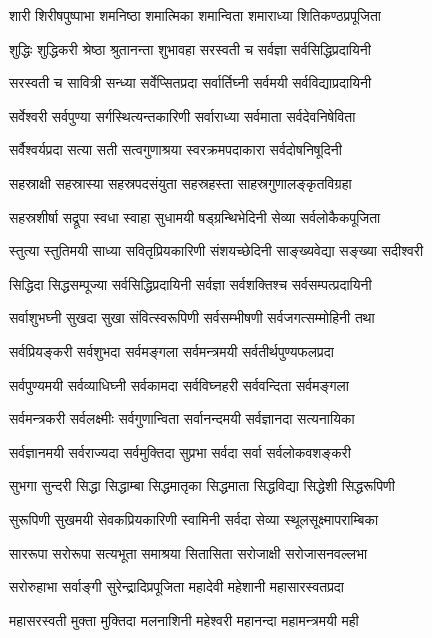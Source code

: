 \twolineshloka
{शारी शिरीषपुष्पाभा शमनिष्ठा शमात्मिका}
{शमान्विता शमाराध्या शितिकण्ठप्रपूजिता}%

\twolineshloka
{शुद्धिः शुद्धिकरी श्रेष्ठा श्रुतानन्ता शुभावहा}
{सरस्वती च सर्वज्ञा सर्वसिद्धिप्रदायिनी}%

\twolineshloka
{सरस्वती च सावित्री सन्ध्या सर्वेप्सितप्रदा}
{सर्वार्तिघ्नी सर्वमयी सर्वविद्याप्रदायिनी}%

\twolineshloka
{सर्वेश्वरी सर्वपुण्या सर्गस्थित्यन्तकारिणी}
{सर्वाराध्या सर्वमाता सर्वदेवनिषेविता}%

\twolineshloka
{सर्वैश्वर्यप्रदा सत्या सती सत्वगुणाश्रया}
{स्वरक्रमपदाकारा सर्वदोषनिषूदिनी}%

\twolineshloka
{सहस्राक्षी सहस्रास्या सहस्रपदसंयुता}
{सहस्रहस्ता साहस्रगुणालङ्कृतविग्रहा}%

\twolineshloka
{सहस्रशीर्षा सद्रूपा स्वधा स्वाहा सुधामयी}
{षड्ग्रन्थिभेदिनी सेव्या सर्वलोकैकपूजिता}%

\twolineshloka
{स्तुत्या स्तुतिमयी साध्या सवितृप्रियकारिणी}
{संशयच्छेदिनी साङ्ख्यवेद्या सङ्ख्या सदीश्वरी}%

\twolineshloka
{सिद्धिदा सिद्धसम्पूज्या सर्वसिद्धिप्रदायिनी}
{सर्वज्ञा सर्वशक्तिश्च सर्वसम्पत्प्रदायिनी}%

\twolineshloka
{सर्वाशुभघ्नी सुखदा सुखा संवित्स्वरूपिणी}
{सर्वसम्भीषणी सर्वजगत्सम्मोहिनी तथा}%

\twolineshloka
{सर्वप्रियङ्करी सर्वशुभदा सर्वमङ्गला}
{सर्वमन्त्रमयी सर्वतीर्थपुण्यफलप्रदा}%

\twolineshloka
{सर्वपुण्यमयी सर्वव्याधिघ्नी सर्वकामदा}
{सर्वविघ्नहरी सर्ववन्दिता सर्वमङ्गला}%

\twolineshloka
{सर्वमन्त्रकरी सर्वलक्ष्मीः सर्वगुणान्विता}
{सर्वानन्दमयी सर्वज्ञानदा सत्यनायिका}%

\twolineshloka
{सर्वज्ञानमयी सर्वराज्यदा सर्वमुक्तिदा}
{सुप्रभा सर्वदा सर्वा सर्वलोकवशङ्करी}%

\twolineshloka
{सुभगा सुन्दरी सिद्धा सिद्धाम्बा सिद्धमातृका}
{सिद्धमाता सिद्धविद्या सिद्धेशी सिद्धरूपिणी}%

\twolineshloka
{सुरूपिणी सुखमयी सेवकप्रियकारिणी}
{स्वामिनी सर्वदा सेव्या स्थूलसूक्ष्मापराम्बिका}%

\twolineshloka
{साररूपा सरोरूपा सत्यभूता समाश्रया}
{सितासिता सरोजाक्षी सरोजासनवल्लभा}%

\twolineshloka
{सरोरुहाभा सर्वाङ्गी सुरेन्द्रादिप्रपूजिता}
{महादेवी महेशानी महासारस्वतप्रदा}%

\twolineshloka
{महासरस्वती मुक्ता मुक्तिदा मलनाशिनी}
{महेश्वरी महानन्दा महामन्त्रमयी मही}%

